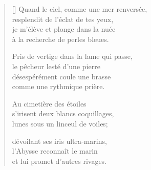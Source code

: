 \documentclass[11pt,a4paper]{article}
\begin{document}
\thispagestyle{empty}



\settowidth{\versewidth}{Quand le ciel, comme une mer renversée,}

\bigskip

\begin{verse}[\versewidth]
  Quand le ciel, comme une mer renversée, \\
  resplendit de l'éclat de tes yeux, \\
  je m'élève et plonge dans la nuée \\
  à la recherche de perles bleues.

  Pris de vertige dans la lame qui passe, \\
  le pêcheur lesté d'une pierre \\
  désespérément coule une brasse \\
  comme une rythmique prière.

  Au cimetière des étoiles \\
  s'irisent deux blancs coquillages, \\
  lunes sous un linceul de voiles;

  dévoilant ses iris ultra-marins, \\
  l'Abysse reconnaît le marin \\
  et lui promet d'autres rivages.
\end{verse}
\end{document}

